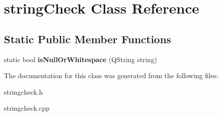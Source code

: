 \hypertarget{classstring_check}{}\section{string\+Check Class Reference}
\label{classstring_check}
\subsection*{Static Public Member Functions}
\begin{DoxyCompactItemize}
\item 
\mbox{\label{classstring_check_a25a6eebd6a36799e3a2c8335288929d2}} 
static bool {\bfseries is\+Null\+Or\+Whitespace} (Q\+String string)
\end{DoxyCompactItemize}


The documentation for this class was generated from the following files\+:\begin{DoxyCompactItemize}
\item 
stringcheck.\+h\item 
stringcheck.\+cpp\end{DoxyCompactItemize}
